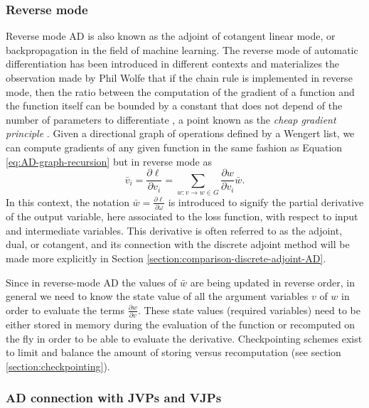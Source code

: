 \subsubsection{Reverse mode}

Reverse mode AD is also known as the adjoint of cotangent linear mode, or backpropagation in the field of machine learning. 
The reverse mode of automatic differentiation has been introduced in different contexts \cite{griewank2012invented} and materializes the observation made by Phil Wolfe that if the chain rule is implemented in reverse mode, then the ratio between the computation of the gradient of a function and the function itself can be bounded by a constant that does not depend of the number of parameters to differentiate \cite{Griewank_1989, Wolfe_1982}, a point known as the \textit{cheap gradient principle} \cite{griewank2012invented}.  
Given a directional graph of operations defined by a Wengert list, we can compute gradients of any given function in the same fashion as Equation \eqref{eq:AD-graph-recursion} but in reverse mode as
\begin{equation}
    \bar v_i 
    = 
    \frac{\partial \ell}{\partial v_i}= \sum_{w : v \rightarrow w \in G} \frac{\partial w}{\partial v_i} \bar{w}.
    \label{eq:reverse-mode-ad-definition}
\end{equation}
In this context, the notation $\bar{w} = \frac{\partial \ell}{\partial \omega}$ is introduced to signify the partial derivative of the output variable, here associated to the loss function, with respect to input and intermediate variables. 
This derivative is often referred to as the adjoint, dual, or cotangent, and its connection with the discrete adjoint method will be made more explicitly in Section \ref{section:comparison-discrete-adjoint-AD}. 

Since in reverse-mode AD the values of $\bar w$ are being updated in reverse order, in general
we need to know the state value of all the argument variables $v$ of $w$ in order to evaluate the terms $\frac{\partial w}{\partial v}$.
These state values (required variables) need to be either stored in memory during the evaluation of the function or recomputed on the fly in order to be able to evaluate the derivative. 
Checkpointing schemes exist to limit and balance the amount of storing versus recomputation (see section \ref{section:checkpointing}).


\subsubsection{AD connection with JVPs and VJPs}
\label{sec:vjp-jvp}

